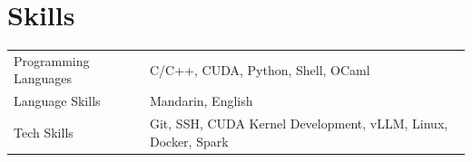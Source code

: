 \documentclass[a4paper,12pt]{article}
\begin{document}
\begin{tabularx}{\linewidth}{ @{}l r@{} }


\end{tabularx}


\section{Skills}
\begin{tabularx}{\linewidth}{@{}l X@{}}
Programming Languages &  \normalsize{C/C++, CUDA, Python, Shell, OCaml} \\
Language Skills  &  \normalsize{Mandarin, English} \\
Tech Skills & \normalsize{Git, SSH, CUDA Kernel Development, vLLM, Linux, Docker, Spark} \\
\end{tabularx}

\vfill
{}
\end{document}
